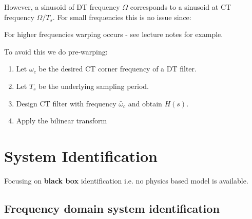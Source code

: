 \documentclass[8pt,a4paper]{scrartcl}
\begin{document}
\begin{multicols*}{3}
However, a sinusoid of DT frequency $\Omega$ corresponds to a sinusoid at CT frequency $\Omega/T_s$. For small frequencies this is no issue since:


For higher frequencies warping occurs - see lecture notes for example.

To avoid this we do pre-warping:

\begin{enumerate}
\ncompaq
\item Let $\omega_c$ be the desired CT corner frequency of a DT filter.
\item Let $T_s$ be the underlying sampling period.


\item Design CT filter with frequency $\bar{\omega}_c$ and obtain $H(s)$.
\item Apply the bilinear transform
\end{enumerate}



\section{System Identification}

Focusing on \textbf{black box} identification i.e. no physics based model is available.

\subsection{Frequency domain system identification}




\end{multicols*}
\end{document}
